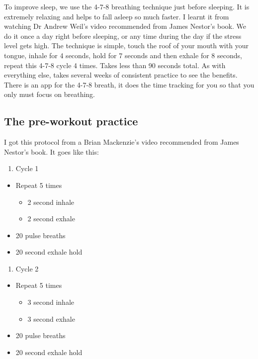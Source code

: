 \documentclass[
  oneside]{book}
\providecommand{\tightlist}{%
  \setlength{\itemsep}{0pt}\setlength{\parskip}{0pt}}
\begin{document}
To improve sleep, we use the 4-7-8 breathing technique just before sleeping. It is extremely relaxing and helps to fall asleep so much faster. I learnt it from watching Dr Andrew Weil's video recommended from James Nestor's book. We do it once a day right before sleeping, or any time during the day if the stress level gets high. The technique is simple, touch the roof of your mouth with your tongue, inhale for 4 seconds, hold for 7 seconds and then exhale for 8 seconds, repeat this 4-7-8 cycle 4 times. Takes less than 90 seconds total. As with everything else, takes several weeks of consistent practice to see the benefits. There is an app for the 4-7-8 breath, it does the time tracking for you so that you only must focus on breathing.

\hypertarget{the-pre-workout-practice}{%
\subsection{The pre-workout practice}\label{the-pre-workout-practice}}

I got this protocol from a Brian Mackenzie's video recommended from James Nestor's book. It goes like this:

\begin{enumerate}
\def\labelenumi{\arabic{enumi}.}
\tightlist
\item
  Cycle 1
\end{enumerate}

\begin{itemize}
\tightlist
\item
  Repeat 5 times

  \begin{itemize}
  \tightlist
  \item
    2 second inhale
  \item
    2 second exhale
  \end{itemize}
\item
  20 pulse breaths
\item
  20 second exhale hold
\end{itemize}

\begin{enumerate}
\def\labelenumi{\arabic{enumi}.}
\setcounter{enumi}{1}
\tightlist
\item
  Cycle 2
\end{enumerate}

\begin{itemize}
\tightlist
\item
  Repeat 5 times

  \begin{itemize}
  \tightlist
  \item
    3 second inhale
  \item
    3 second exhale
  \end{itemize}
\item
  20 pulse breaths
\item
  20 second exhale hold
\end{itemize}
\end{document}
